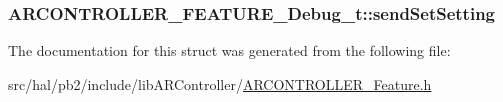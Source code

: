 \subsubsection[{\texorpdfstring{send\+Set\+Setting}{sendSetSetting}}]{ A\+R\+C\+O\+N\+T\+R\+O\+L\+L\+E\+R\+\_\+\+F\+E\+A\+T\+U\+R\+E\+\_\+\+Debug\+\_\+t\+::send\+Set\+Setting}\hypertarget{struct_a_r_c_o_n_t_r_o_l_l_e_r___f_e_a_t_u_r_e___debug__t_acdaa60c7a4d653123b97ec441b7462e0}{}\label{struct_a_r_c_o_n_t_r_o_l_l_e_r___f_e_a_t_u_r_e___debug__t_acdaa60c7a4d653123b97ec441b7462e0}


The documentation for this struct was generated from the following file\+:\begin{DoxyCompactItemize}
\item 
src/hal/pb2/include/lib\+A\+R\+Controller/\hyperlink{_a_r_c_o_n_t_r_o_l_l_e_r___feature_8h}{A\+R\+C\+O\+N\+T\+R\+O\+L\+L\+E\+R\+\_\+\+Feature.\+h}\end{DoxyCompactItemize}
